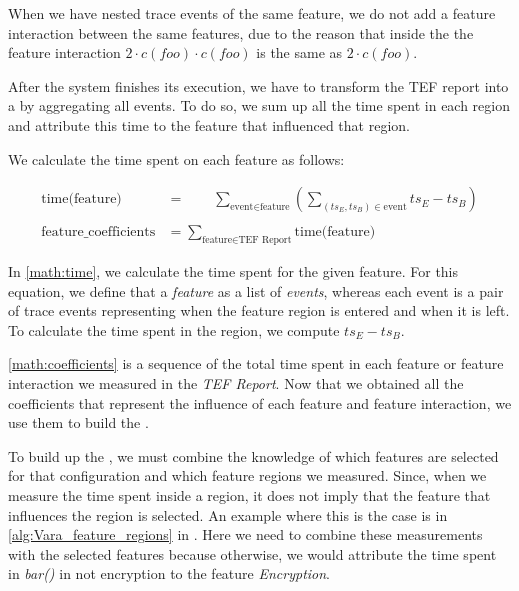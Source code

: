 When we have nested trace events of the same feature, we do not add a feature interaction between the same features, 
due to the reason that inside the {\perfInfluenceModel} the feature interaction $2 \cdot c(foo) \cdot c(foo)$ is the same as $2 \cdot c(foo)$.

After the system finishes its execution, we have to transform the \acs{TEF} report into a {\perfInfluenceModel} by aggregating all events. 
To do so, we sum up all the time spent in each region and attribute this time to the feature that influenced that region. 

We calculate the time spent on each feature as follows:


\begin{align}
    \text{time(feature)} &= \textit{ }\textit{ }\textit{ } \sum_{\text{event} \in \text{feature}} \left( \sum_{(ts_E, ts_B) \in \text{event}} ts_E - ts_B \right) \label{math:time} \\ \nonumber \\
    \text{feature\_coefficients} &= \sum_{\text{feature} \in \text{TEF Report}}\text{time(feature)} \label{math:coefficients}
\end{align}

In \autoref{math:time}, we calculate the time spent for the given feature. 
For this equation, we define that a \textit{feature} as a list of \textit{events}, 
whereas each event is a pair of trace events representing when the feature region is entered and when it is left. 
To calculate the time spent in the region, we compute $ts_E - ts_B$.

\autoref{math:coefficients} is a sequence of the total time spent in each feature or feature interaction we measured in the \textit{\acs{TEF} Report}. 
Now that we obtained all the coefficients that represent the influence of each feature and feature interaction, we use them to build the \perfInfluenceModel.

To build up the {\perfInfluenceModel}, we must combine the knowledge of which features are selected for that configuration and which 
feature regions we measured. Since, when we measure the time spent inside a region, 
it does not imply that the feature that influences the region is selected. 
An example where this is the case is in \autoref{alg:Vara_feature_regions} in .
Here we need to combine these measurements with the selected features because otherwise,
we would attribute the time spent in \emph{bar()} in not encryption to the feature \emph{Encryption}.

